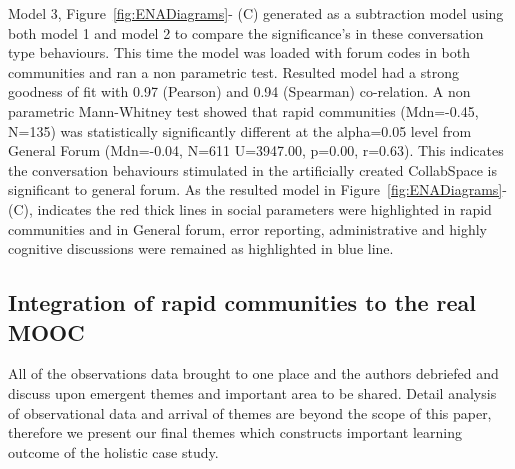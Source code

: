 \documentclass[manuscript,screen,review]{acmart}
\begin{document}
Model 3, Figure~\ref{fig:ENADiagrams}- (C) generated as a subtraction model using both model 1 and model 2 to compare the significance's in these conversation type behaviours. This time the model was loaded with forum codes in both communities and ran a non parametric test. Resulted model had a strong goodness of fit with 0.97 (Pearson) and 0.94 (Spearman) co-relation. A non parametric Mann-Whitney test showed that rapid communities (Mdn=-0.45, N=135) was statistically significantly different at the alpha=0.05 level from General Forum (Mdn=-0.04, N=611 U=3947.00, p=0.00, r=0.63). This indicates the conversation behaviours stimulated in the artificially created CollabSpace is significant to general forum. As the resulted model in Figure~\ref{fig:ENADiagrams}-(C), indicates the red thick lines in social parameters were highlighted in rapid communities and in General forum, error reporting, administrative and highly cognitive discussions were remained as highlighted in blue line.

\subsection{Integration of rapid communities to the real MOOC}

All of the observations data brought to one place and the authors debriefed and discuss upon emergent themes and important area to be shared. Detail analysis of observational data and arrival of themes are beyond the scope of this paper, therefore we present our final themes which constructs important learning outcome of the holistic case study.  
\end{document}
